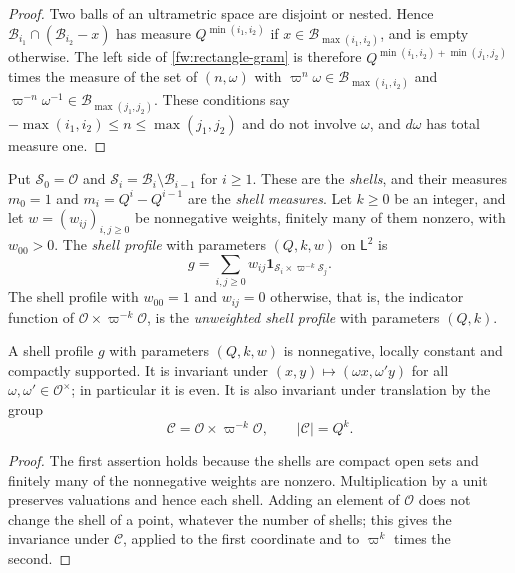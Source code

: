 \begin{proof}
Two balls of an ultrametric space are disjoint or nested. Hence
$\mathcal B_{i_1}\cap(\mathcal B_{i_2}-x)$ has measure
$Q^{\min(i_1,i_2)}$ if $x\in\mathcal B_{\max(i_1,i_2)}$, and is empty
otherwise. The left side of \eqref{fw:rectangle-gram} is therefore
$Q^{\min(i_1,i_2)+\min(j_1,j_2)}$ times the measure of the set of
$(n,\omega)$ with $\varpi^n\omega\in\mathcal B_{\max(i_1,i_2)}$ and
$\varpi^{-n}\omega^{-1}\in\mathcal B_{\max(j_1,j_2)}$. These conditions
say $-\max(i_1,i_2)\le n\le\max(j_1,j_2)$ and do not involve $\omega$,
and $d\omega$ has total measure one.
\end{proof}

\begin{definition}\label{fw:shell-profile}
Put $\mathcal S_0=\mathcal O$ and $\mathcal S_i=\mathcal B_i\setminus
\mathcal B_{i-1}$ for $i\ge1$. These are the \emph{shells}, and their
measures $m_0=1$ and $m_i=Q^i-Q^{i-1}$ are the \emph{shell measures}.
Let $k\ge0$ be an integer, and let $w=(w_{ij})_{i,j\ge0}$ be nonnegative
weights, finitely many of them nonzero, with $w_{00}>0$. The
\emph{shell profile} with parameters $(Q,k,w)$ on $\mathsf L^2$ is
\[
 g=\sum_{i,j\ge0}w_{ij}\mathbf 1_{\mathcal S_i\times\varpi^{-k}\mathcal S_j}.
\]
The shell profile with $w_{00}=1$ and $w_{ij}=0$ otherwise, that is, the
indicator function of $\mathcal O\times\varpi^{-k}\mathcal O$, is the
\emph{unweighted shell profile} with parameters $(Q,k)$.
\end{definition}

\begin{lemma}\label{fw:shell-invariance}
A shell profile $g$ with parameters $(Q,k,w)$ is nonnegative, locally
constant and compactly supported. It is invariant under
$(x,y)\mapsto(\omega x,\omega'y)$ for all $\omega,\omega'\in\mathcal
O^\times$; in particular it is even. It is also invariant under
translation by the group
\begin{equation}\label{fw:hard-period}
 \mathcal C=\mathcal O\times\varpi^{-k}\mathcal O,\qquad |\mathcal C|=Q^k.
\end{equation}
\end{lemma}

\begin{proof}
The first assertion holds because the shells are compact open sets and
finitely many of the nonnegative weights are nonzero. Multiplication by
a unit preserves valuations and hence each shell. Adding an element of
$\mathcal O$ does not change the shell of a point, whatever the number
of shells; this gives the invariance under $\mathcal C$, applied to the
first coordinate and to $\varpi^k$ times the second.
\end{proof}

